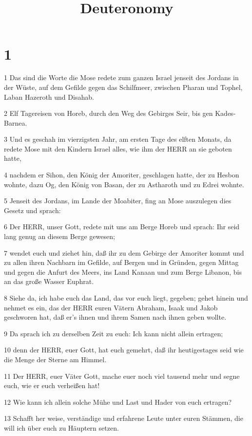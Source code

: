 

\title{Deuteronomy}


\chapter{1}

\par 1 Das sind die Worte die Mose redete zum ganzen Israel jenseit des Jordans in der Wüste, auf dem Gefilde gegen das Schilfmeer, zwischen Pharan und Tophel, Laban Hazeroth und Disahab.
\par 2 Elf Tagereisen von Horeb, durch den Weg des Gebirges Seir, bis gen Kades-Barnea.
\par 3 Und es geschah im vierzigsten Jahr, am ersten Tage des elften Monats, da redete Mose mit den Kindern Israel alles, wie ihm der HERR an sie geboten hatte,
\par 4 nachdem er Sihon, den König der Amoriter, geschlagen hatte, der zu Hesbon wohnte, dazu Og, den König von Basan, der zu Astharoth und zu Edrei wohnte.
\par 5 Jenseit des Jordans, im Lande der Moabiter, fing an Mose auszulegen dies Gesetz und sprach:
\par 6 Der HERR, unser Gott, redete mit uns am Berge Horeb und sprach: Ihr seid lang genug an diesem Berge gewesen;
\par 7 wendet euch und ziehet hin, daß ihr zu dem Gebirge der Amoriter kommt und zu allen ihren Nachbarn im Gefilde, auf Bergen und in Gründen, gegen Mittag und gegen die Anfurt des Meers, ins Land Kanaan und zum Berge Libanon, bis an das große Wasser Euphrat.
\par 8 Siehe da, ich habe euch das Land, das vor euch liegt, gegeben; gehet hinein und nehmet es ein, das der HERR euren Vätern Abraham, Isaak und Jakob geschworen hat, daß er's ihnen und ihrem Samen nach ihnen geben wollte.
\par 9 Da sprach ich zu derselben Zeit zu euch: Ich kann nicht allein ertragen;
\par 10 denn der HERR, euer Gott, hat euch gemehrt, daß ihr heutigestages seid wie die Menge der Sterne am Himmel.
\par 11 Der HERR, euer Väter Gott, mache euer noch viel tausend mehr und segne euch, wie er euch verheißen hat!
\par 12 Wie kann ich allein solche Mühe und Last und Hader von euch ertragen?
\par 13 Schafft her weise, verständige und erfahrene Leute unter euren Stämmen, die will ich über euch zu Häuptern setzen.

